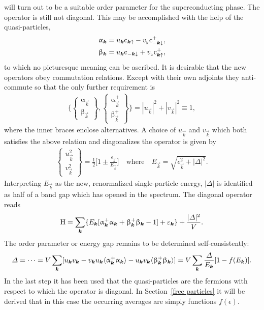 %
will turn out to be a suitable order parameter for the superconducting phase.
The  operator is still not diagonal. This may be accomplished
with the help of the  quasi-particles,
%
\begin{align*}
    \upalpha_{\boldsymbol k} &=
        u_{\boldsymbol k} \mathrm c_{\boldsymbol k \uparrow} - v_{\sb{\text{k}}} \mathrm c_{-\boldsymbol k \downarrow}^+, \\
    \upbeta_{\boldsymbol k} &=
        u_{\boldsymbol k} \mathrm c_{-\boldsymbol k \downarrow} + v_{\sb{\text{k}}} \mathrm c_{\boldsymbol k \uparrow}^+,
\end{align*}
%
to which no picturesque meaning can be ascribed. It is desirable that the new
operators obey  commutation relations. Except with their own
adjoints they anti-commute so that the only further requirement is
%
\begin{gather*}
    \Bigg \{
        \begin{Bmatrix} \upalpha_{\vec k}   \\ \upbeta_{\vec k}   \end{Bmatrix},
        \begin{Bmatrix} \upalpha_{\vec k}^+ \\ \upbeta_{\vec k}^+ \end{Bmatrix}
    \Bigg \}
    = |u_{\vec k}|^2 + |v_{\vec k}|^2 \equiv 1,
\end{gather*}
%
where the inner braces enclose alternatives. A choice of $u_{\vec k}$ and
$v_{\vec k}$ which both satisfies the above relation and diagonalizes the
 operator is given by
%
\begin{gather*}
    \begin{Bmatrix} u_{\vec k}^2 \\ v_{\vec k}^2 \end{Bmatrix} = \frac 1 2
    \Big[ 1 \pm \frac{\epsilon_{\vec k}}{E_{\vec k}} \Big]
    \quad \text{where} \quad
    E_{\vec k} = \sqrt{\epsilon_{\vec k}^2 + |\Delta|^2}.
\end{gather*}
%
Interpreting $E_{\vec k}$ as the new, renormalized single-particle energy,
$|\Delta|$ is identified as half of a band gap which has opened in the spectrum.
The diagonal  operator reads
%
\begin{gather*}
    \mathrm H =
    \sum_{\boldsymbol k} \{ E_{\boldsymbol k} [
        \upalpha_{\boldsymbol k}^+ \upalpha_{\boldsymbol k}
        + \upbeta_{\boldsymbol k}^+ \upbeta_{\boldsymbol k} - 1
        ]
    + \varepsilon_{\boldsymbol k} \} + \frac {|\varDelta|^2} V.
\end{gather*}
%
The order parameter or energy gap remains to be determined self-consistently:
%
\begin{gather*}
    \varDelta = \dots
    = V \sum_{\boldsymbol k} [
        u_{\boldsymbol k} v_{\boldsymbol k} - v_{\boldsymbol k} u_{\boldsymbol k}
        \langle\upalpha_{\boldsymbol k}^+ \upalpha_{\boldsymbol k}\rangle - u_{\boldsymbol k} v_{\boldsymbol k}
        \langle\upbeta_{\boldsymbol k}^+ \upbeta_{\boldsymbol k}\rangle
        ]
    = V \sum_{\boldsymbol k} \frac {\varDelta} {E_{\boldsymbol k}} [1 - f(E_{\boldsymbol k})].
\end{gather*}
%
In the last step it has been used that the  quasi-particles are
the fermions with respect to which the  operator is diagonal. In
Section~\ref{free particles} it will be derived that in this case the occurring
averages are simply  functions $f(\epsilon)$.

